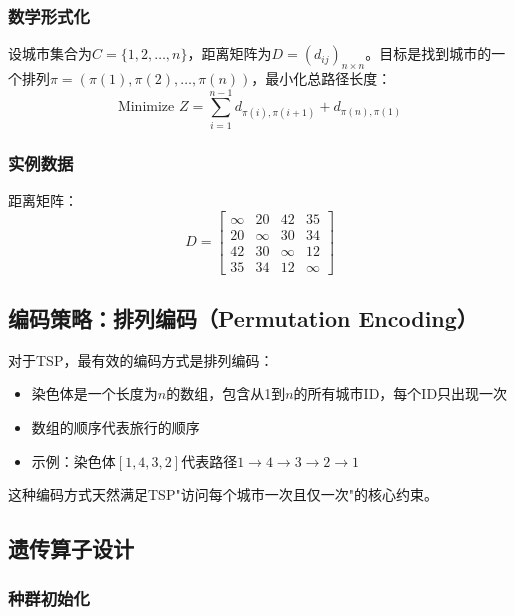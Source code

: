 \subsubsection{数学形式化}

设城市集合为$C = \{1, 2, \dots, n\}$，距离矩阵为$D = (d_{ij})_{n \times n}$。目标是找到城市的一个排列$\pi = (\pi(1), \pi(2), \dots, \pi(n))$，最小化总路径长度：
\[
\text{Minimize } Z = \sum_{i=1}^{n-1} d_{\pi(i), \pi(i+1)} + d_{\pi(n), \pi(1)}
\]

\subsubsection{实例数据}

距离矩阵：
\[
D = \begin{bmatrix}
\infty & 20 & 42 & 35 \\
20 & \infty & 30 & 34 \\
42 & 30 & \infty & 12 \\
35 & 34 & 12 & \infty
\end{bmatrix}
\]

\subsection{编码策略：排列编码（Permutation Encoding）}

对于TSP，最有效的编码方式是排列编码：
\begin{itemize}
    \item 染色体是一个长度为$n$的数组，包含从1到$n$的所有城市ID，每个ID只出现一次
    \item 数组的顺序代表旅行的顺序
    \item 示例：染色体$[1, 4, 3, 2]$代表路径$1 \to 4 \to 3 \to 2 \to 1$
\end{itemize}

这种编码方式天然满足TSP"访问每个城市一次且仅一次"的核心约束。

\subsection{遗传算子设计}

\subsubsection{种群初始化}

